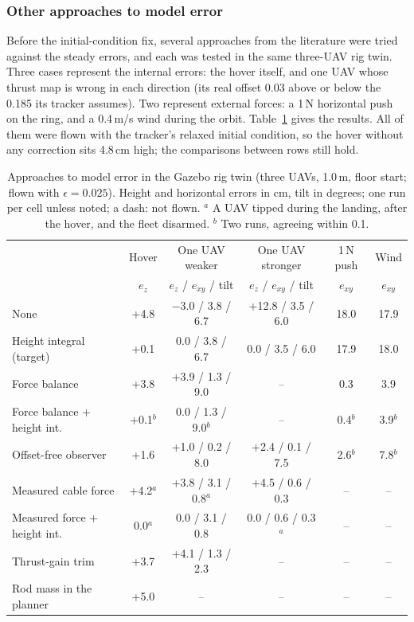 \subsubsection{Other approaches to model error}
\label{sec:sim_methods}

Before the initial-condition fix, several approaches from the literature were tried against the
steady errors, and each was tested in the same three-UAV rig twin. Three
cases represent the internal errors: the hover itself, and one UAV whose thrust map is wrong in
each direction (its real offset 0.03 above or below the 0.185 its tracker assumes). Two represent
external forces: a 1\,N horizontal push on the ring, and a 0.4\,m/s wind during the orbit.
Table~\ref{tab:methods} gives the results. All of them were flown with the tracker's relaxed initial
condition, so the hover without any correction sits 4.8\,cm high; the comparisons between rows still
hold.

\begin{table}[h]
\centering
\footnotesize
\setlength{\tabcolsep}{4pt}
\caption{Approaches to model error in the Gazebo rig twin (three UAVs, 1.0\,m, floor start; flown
with $\epsilon = 0.025$). Height and horizontal errors in cm, tilt in degrees; one run per cell
unless noted; a dash: not flown. $^{a}$ A UAV tipped during the landing, after the hover, and the fleet
disarmed. $^{b}$ Two runs, agreeing within 0.1.}
\label{tab:methods}
\begin{tabular}{lccccc}
\toprule
 & Hover & One UAV weaker & One UAV stronger & 1\,N push & Wind \\
 & $e_z$ & $e_z$ / $e_{xy}$ / tilt & $e_z$ / $e_{xy}$ / tilt & $e_{xy}$ & $e_{xy}$ \\
\midrule
None & +4.8 & $-$3.0 / 3.8 / 6.7 & +12.8 / 3.5 / 6.0 & 18.0 & 17.9 \\
Height integral (target) & +0.1 & 0.0 / 3.8 / 6.7 & 0.0 / 3.5 / 6.0 & 17.9 & 18.0 \\
Force balance & +3.8 & +3.9 / 1.3 / 9.0 & -- & 0.3 & 3.9 \\
Force balance + height int. & +0.1$^{b}$ & 0.0 / 1.3 / 9.0$^{b}$ & -- & 0.4$^{b}$ & 3.9$^{b}$ \\
Offset-free observer & +1.6 & +1.0 / 0.2 / 8.0 & +2.4 / 0.1 / 7.5 & 2.6$^{b}$ & 7.8$^{b}$ \\
Measured cable force & +4.2$^{a}$ & +3.8 / 3.1 / 0.8$^{a}$ & +4.5 / 0.6 / 0.3 & -- & -- \\
Measured force + height int. & 0.0$^{a}$ & 0.0 / 3.1 / 0.8 & 0.0 / 0.6 / 0.3$^{a}$ & -- & -- \\
Thrust-gain trim & +3.7 & +4.1 / 1.3 / 2.3 & -- & -- & -- \\
Rod mass in the planner & +5.0 & -- & -- & -- & -- \\
\bottomrule
\end{tabular}
\end{table}

